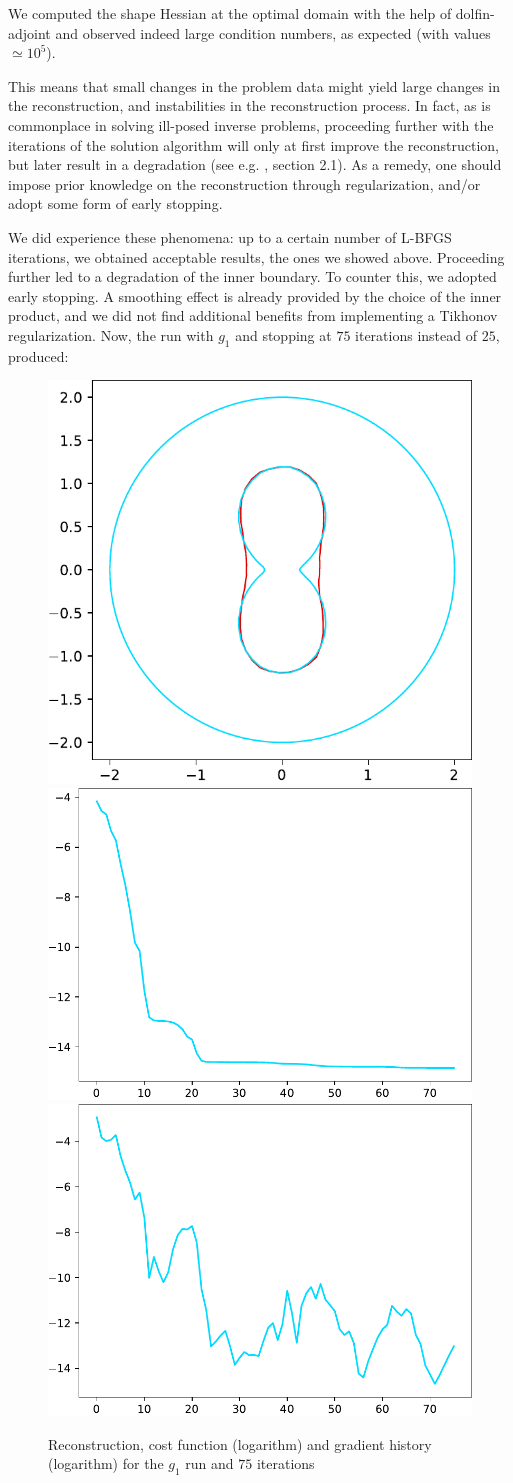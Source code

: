 \documentclass[english,a4paper,10pt,oneside]{scrbook}	%
\theoremstyle{break}
\theoremstyle{remark}
\begin{document}
We computed the shape Hessian at the optimal domain with the help of dolfin-adjoint and observed indeed large condition numbers, as expected (with values $\simeq 10^5$).

This means that small changes in the problem data might yield large changes in the reconstruction, and instabilities in the reconstruction process. In fact, as is commonplace in solving ill-posed inverse problems, proceeding further with the iterations of the solution algorithm will only at first improve the reconstruction, but later result in a degradation (see e.g. \cite{kirsch}, section 2.1). As a remedy, one should impose prior knowledge on the reconstruction through regularization, and/or adopt some form of early stopping. 

We did experience these phenomena: up to a certain number of L-BFGS iterations, we obtained acceptable results, the ones we showed above. Proceeding further led to a degradation of the inner boundary. To counter this, we adopted early stopping. A smoothing effect is already provided by the choice of the inner product, and we did not find additional benefits from implementing a Tikhonov regularization. Now, the run with $g_1$ and stopping at $75$ iterations instead of $25$, produced:

\begin{figure}[H]
\centering
\includegraphics[height=0.25\columnwidth]{Images/hourglass_constant_degenerate/comparison.pdf}
\includegraphics[height=0.25\columnwidth]{Images/hourglass_constant_degenerate/cost_function.pdf}
\includegraphics[height=0.25\columnwidth]{Images/hourglass_constant_degenerate/gradient_infty_norm.pdf}
\caption{Reconstruction, cost function (logarithm) and gradient history (logarithm) for the $g_1$ run and $75$ iterations}\label{fig:degenerate}
\end{figure}
\end{document}

